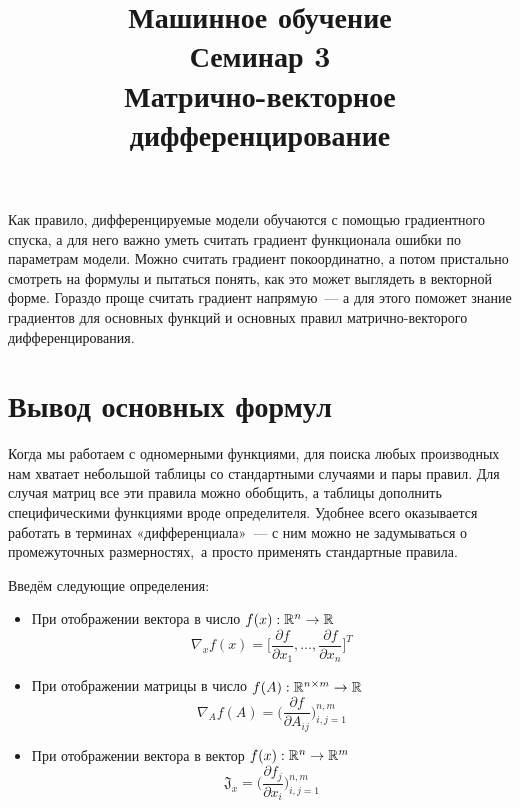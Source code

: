 \documentclass[12pt,fleqn]{article}
\begin{document}
\title{Машинное обучение\\Семинар 3\\Матрично-векторное дифференцирование}
\author{}
\date{}
\maketitle

Как правило, дифференцируемые модели обучаются с помощью градиентного спуска, а для него важно уметь считать градиент функционала ошибки по параметрам модели. Можно считать градиент покоординатно, а потом пристально смотреть на формулы и пытаться понять, как это может выглядеть в векторной форме. Гораздо проще считать градиент напрямую~--- а для этого поможет знание градиентов для основных функций и основных правил матрично-векторого дифференцирования.

\section{Вывод основных формул}

Когда мы работаем с одномерными функциями, для поиска любых производных нам хватает небольшой таблицы со стандартными случаями и пары правил. Для случая матриц все эти правила можно обобщить, а таблицы дополнить специфическими функциями вроде определителя. Удобнее всего оказывается работать в терминах «дифференциала»~--- с ним можно не задумываться о промежуточных размерностях,~а просто применять стандартные правила.

Введём следующие определения:
\begin{itemize}
    \item При отображении вектора в число $f(x): \mathbb{R}^n \to \mathbb{R}$ 
    \[
        \nabla_x f(x)
        =
        \bigg[
            \frac{\partial f}{\partial x_1},
            \dots,
            \frac{\partial f}{\partial x_n}
        \bigg]^T
    \]

    \item При отображении матрицы в число $f(A): \RR^{n \times m} \to \RR$
    \[
        \nabla_A f(A)
        =
        \bigg(
            \frac{\partial f}{\partial A_{ij}}
        \bigg)_{i,j=1}^{n,m}
    \]
    
    \item При отображении вектора в вектор $f(x): \mathbb{R}^n \to \mathbb{R}^m$
    \[
        \mathfrak{J}_x = \bigg(
            \frac{\partial f_{j}}{\partial x_{i}}
        \bigg)_{i,j=1}^{n,m}
    \]
\end{itemize}
\end{document}
